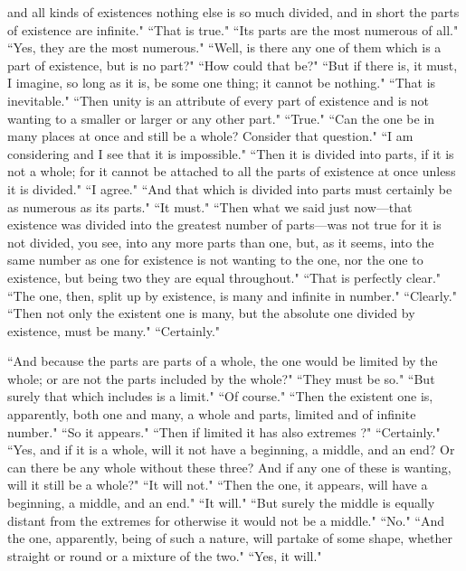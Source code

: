\documentclass[letterpaper,12pt]{article}
\newcommand{\stephpag}[1]{\marginnote{\small\itshape\fontfamily{ppl}\selectfont #1}}
\begin{document}
and all kinds of existences nothing else is so much divided, \stephpag{c} and in short the parts of existence are infinite." ``That is true." ``Its parts are the most numerous of all." ``Yes, they are the most numerous." ``Well, is there any one of them which is a part of existence, but is no part?" ``How could that be?" ``But if there is, it must, I imagine, so long as it is, be some one thing; it cannot be nothing." ``That is inevitable." ``Then unity is an attribute of every part of existence and is not wanting to a smaller or larger or any other part." ``True." \stephpag{d} ``Can the one be in many places at once and still be a whole? Consider that question." ``I am considering and I see that it is impossible." ``Then it is divided into parts, if it is not a whole; for it cannot be attached to all the parts of existence at once unless it is divided." ``I agree." ``And that which is divided into parts must certainly be as numerous as its parts." ``It must." ``Then what we said just now—that existence was divided into the greatest number of parts—was not true for it is not divided, you see, into any more parts than one, \stephpag{e} but, as it seems, into the same number as one for existence is not wanting to the one, nor the one to existence, but being two they are equal throughout." ``That is perfectly clear." ``The one, then, split up by existence, is many and infinite in number." ``Clearly." ``Then not only the existent one is many, but the absolute one divided by existence, must be many." ``Certainly."

``And because the parts are parts of a whole, the one would be limited by the whole; \stephpag{145 a} or are not the parts included by the whole?" ``They must be so." ``But surely that which includes is a limit." ``Of course." ``Then the existent one is, apparently, both one and many, a whole and parts, limited and of infinite number." ``So it appears." ``Then if limited it has also extremes ?" ``Certainly." ``Yes, and if it is a whole, will it not have a beginning, a middle, and an end? Or can there be any whole without these three? And if any one of these is wanting, will it still be a whole?" ``It will not." \stephpag{b} ``Then the one, it appears, will have a beginning, a middle, and an end." ``It will." ``But surely the middle is equally distant from the extremes for otherwise it would not be a middle." ``No." ``And the one, apparently, being of such a nature, will partake of some shape, whether straight or round or a mixture of the two." ``Yes, it will."
\end{document}
